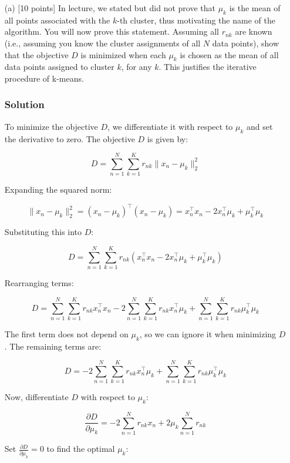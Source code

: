 \documentclass{article}
\begin{document}
\begin{enumerate}
    \item [(a)] [10 points] In lecture, we stated but did not prove that $\mu_k$ is the mean of all points associated with the $k$-th cluster, thus motivating the name of the algorithm. You will now prove this statement. Assuming all $r_{nk}$ are known (i.e., assuming you know the cluster assignments of all $N$ data points), show that the objective $D$ is minimized when each $\mu_k$ is chosen as the mean of all data points assigned to cluster $k$, for any $k$. This justifies the iterative procedure of k-means.

    \subsubsection*{Solution}
    To minimize the objective \( D \), we differentiate it with respect to \(\mu_k\) and set the derivative to zero. The objective \( D \) is given by:

    \[
    D = \sum_{n=1}^N \sum_{k=1}^K r_{nk} \|x_n - \mu_k\|_2^2
    \]

    Expanding the squared norm:

    \[
    \|x_n - \mu_k\|_2^2 = (x_n - \mu_k)^\top (x_n - \mu_k) = x_n^\top x_n - 2 x_n^\top \mu_k + \mu_k^\top \mu_k
    \]

    Substituting this into \( D \):

    \[
    D = \sum_{n=1}^N \sum_{k=1}^K r_{nk} \left( x_n^\top x_n - 2 x_n^\top \mu_k + \mu_k^\top \mu_k \right)
    \]

    Rearranging terms:

    \[
    D = \sum_{n=1}^N \sum_{k=1}^K r_{nk} x_n^\top x_n - 2 \sum_{n=1}^N \sum_{k=1}^K r_{nk} x_n^\top \mu_k + \sum_{n=1}^N \sum_{k=1}^K r_{nk} \mu_k^\top \mu_k
    \]

    The first term does not depend on \(\mu_k\), so we can ignore it when minimizing \( D \). The remaining terms are:

    \[
    D = -2 \sum_{n=1}^N \sum_{k=1}^K r_{nk} x_n^\top \mu_k + \sum_{n=1}^N \sum_{k=1}^K r_{nk} \mu_k^\top \mu_k
    \]

    Now, differentiate \( D \) with respect to \(\mu_k\):

    \[
    \frac{\partial D}{\partial \mu_k} = -2 \sum_{n=1}^N r_{nk} x_n + 2 \mu_k \sum_{n=1}^N r_{nk}
    \]

    Set \(\frac{\partial D}{\partial \mu_k} = 0\) to find the optimal \(\mu_k\):


\end{enumerate}
\end{document}
